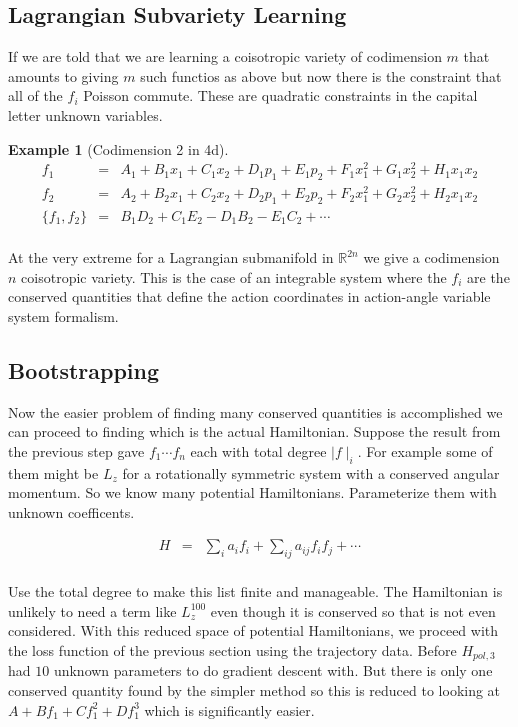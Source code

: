 \documentclass[a4paper,landscape]{article}
\theoremstyle{change}
\newtheorem{example}[equation]{Example}
\theoremstyle{nonumberplain}
\numberwithin{equation}{section}
\newcommand\setof[1]{\{ #1 \}}
\newcommand\abs[1]{ \mid #1 \mid }
\begin{document}
\subsection{Lagrangian Subvariety Learning}

If we are told that we are learning a coisotropic variety of codimension $m$ that amounts to giving $m$ such functios as above but now there is the constraint that all of the $f_i$ Poisson commute. These are quadratic constraints in the capital letter unknown variables.

\begin{example}[Codimension 2 in 4d]

\begin{eqnarray*}
f_1 &=& A_1 + B_1 x_1 + C_1 x_2 + D_1 p_1 + E_1 p_2 + F_1 x_1^2 + G_1 x_2^2 + H_1 x_1 x_2\\
f_2 &=& A_2 + B_2 x_1 + C_2 x_2 + D_2 p_1 + E_2 p_2 + F_2 x_1^2 + G_2 x_2^2 + H_2 x_1 x_2\\
\setof{ f_1 , f_2 } &=& B_1 D_2 + C_1 E_2 - D_1 B_2 - E_1 C_2 + \cdots\\
\end{eqnarray*}

\end{example}

At the very extreme for a Lagrangian submanifold in $\mathbb{R}^{2n}$ we give a codimension $n$ coisotropic variety. This is the case of an integrable system where the $f_i$ are the conserved quantities that define the action coordinates in action-angle variable system formalism.

\subsection{Bootstrapping}

Now the easier problem of finding many conserved quantities is accomplished we can proceed to finding which is the actual Hamiltonian. Suppose the result from the previous step gave $f_1 \cdots f_n$ each with total degree $\abs{f}_i$. For example some of them might be $L_z$ for a rotationally symmetric system with a conserved angular momentum. So we know many potential Hamiltonians. Parameterize them with unknown coefficents.

\begin{eqnarray*}
H &=& \sum_i a_i f_i + \sum_{ij} a_{ij} f_i f_j + \cdots\\
\end{eqnarray*}

Use the total degree to make this list finite and manageable. The Hamiltonian is unlikely to need a term like $L_z^{100}$ even though it is conserved so that is not even considered. With this reduced space of potential Hamiltonians, we proceed with the loss function of the previous section using the trajectory data. Before $H_{pol,3}$ had $10$ unknown parameters to do gradient descent with. But there is only one conserved quantity found by the simpler method so this is reduced to looking at $A + B f_1 + C f_1^2 + D f_1^3$ which is significantly easier.
\end{document}
